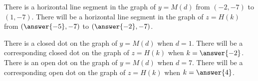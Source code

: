 \documentclass{ximera}
\begin{document}
\begin{example}
\begin{question}
\end{question}


\begin{question}

There is a horizontal line segment in the graph of $y = M(d)$ from $(-2, -7)$ to $(1, -7)$.  There will be a horizontal line segment in the graph of $z = H(k)$ from $\left(\answer{-5}, -7\right)$ to $\left(\answer{-2}, -7\right)$.

\end{question}



\begin{question}

There is a closed dot on the graph of $y= M(d)$  when $d = 1$.  There will be a corresponding closed dot on the graph of $z = H(k)$ when $k = \answer{-2}$. \\


There is an open dot on the graph of $y= M(d)$  when $d = 7$.  There will be a corresponding open dot on the graph of $z = H(k)$ when $k = \answer{4}$.

\end{question}




\end{example}
\end{document}
